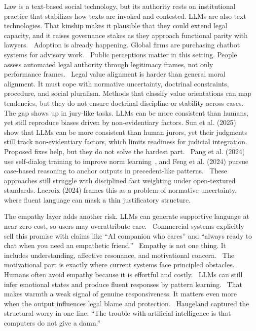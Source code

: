 \documentclass[pdflatex,sn-mathphys-ay]{sn-jnl}%
\theoremstyle{thmstyleone}%
\theoremstyle{thmstyletwo}%
\theoremstyle{thmstylethree}%
\begin{document}
Law is a text-based social technology, but its authority rests on institutional practice that stabilizes how texts are invoked and contested. LLMs are also text technologies. That kinship makes it plausible that they could extend legal capacity, and it raises governance stakes as they approach functional parity with lawyers.~\cite{michael_computational_2020} Adoption is already happening. Global firms are purchasing chatbot systems for advisory work.~\cite{cristina_law_2024} Public perceptions matter in this setting. People assess automated legal authority through legitimacy frames, not only performance frames.~\cite{flanagan_rule_2025} Legal value alignment is harder than general moral alignment. It must cope with normative uncertainty, doctrinal constraints, procedure, and social pluralism. Methods that classify value orientations can map tendencies, but they do not ensure doctrinal discipline or stability across cases.~\cite{zhang_heterogeneous_2024} The gap shows up in jury-like tasks. LLMs can be more consistent than humans, yet still reproduce biases driven by non-evidentiary factors. Sun et al. (2025) show that LLMs can be more consistent than human jurors, yet their judgments still track non-evidentiary factors, which limits readiness for judicial integration. Proposed fixes help, but they do not solve the hardest part.~\cite{sun_large_2025-1} Pang et al. (2024) use self-dialog training to improve norm learning~\cite{pang_self-alignment_2024}, and Feng et al. (2024) pursue case-based reasoning to anchor outputs in precedent-like patterns.~\cite{feng_case_2023} These approaches still struggle with disciplined fact weighting under open-textured standards. Lacroix (2024) frames this as a problem of normative uncertainty, where fluent language can mask a thin justificatory structure.~\cite{lacroix_linguistic_2024-1}

The empathy layer adds another risk. LLMs can generate supportive language at near zero-cost, so users may overattribute care.~\cite{sharma_humanai_2023} Commercial systems explicitly sell this promise with claims like ``AI companion who cares'' and ``always ready to chat when you need an empathetic friend.''~\cite{maples_loneliness_2024} Empathy is not one thing. It includes understanding, affective resonance, and motivational concern.~\cite{zaki_neuroscience_2012} The motivational part is exactly where current systems face principled obstacles.~\cite{montemayor_principle_2022} Humans often avoid empathy because it is effortful and costly.~\cite{ferguson_when_2021} LLMs can still infer emotional states and produce fluent responses by pattern learning.~\cite{wang_systematic_2022} That makes warmth a weak signal of genuine responsiveness. It matters even more when the output influences legal blame and protection.~\cite{shteynberg_does_2024} Haugeland captured the structural worry in one line: ``The trouble with artificial intelligence is that computers do not give a damn.''~\cite{haugeland_understanding_1979}
\end{document}
